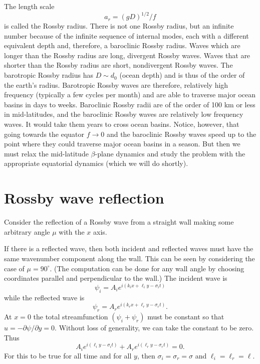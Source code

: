 \sourcepagebreak

The length scale
\[
	a_r=(gD)^{1/2}/f
\]
is called the Rossby radius. There is not one Rossby radius, but an infinite number
because of the infinite sequence of internal modes, each with a different equivalent
depth and, therefore, a baroclinic Rossby radius. Waves which are longer than the
Rossby radius are long, divergent Rossby waves. Waves that are shorter than the Rossby
radius are short, nondivergent Rossby waves. The barotropic Rossby radius has
$D\sim d_0$ (ocean depth) and is thus of the order of the earth's radius. Barotropic
Rossby waves are therefore, relatively high frequency (typically a few cycles per
month) and are able to traverse major ocean basins in days to weeks. Baroclinic Rossby
radii are of the order of 100 km or less in mid-latitudes, and the baroclinic Rossby
waves are relatively low frequency waves. It would take them years to cross ocean
basins. Notice, however, that going towards the equator $f\to0$ and the baroclinic
Rossby waves speed up to the point where they could traverse major ocean basins in a
season. But then we must relax the mid-latitude $\beta$-plane dynamics and study the
problem with the appropriate equatorial dynamics (which we will do shortly).

\section{Rossby wave reflection}

Consider the reflection of a Rossby wave from a straight wall making some arbitrary
angle $\mu$ with the $x$ axis.



If there is a reflected wave, then both incident and reflected waves must have the same
wavenumber component along the wall. This can be seen by considering the case of
$\mu=90^\circ$. (The computation can be done for any wall angle by choosing
coordinates parallel and perpendicular to the wall.) The incident wave is
\[
	\psi_i=A_i e^{i(k_i x+\ell_i y-\sigma_i t)}
\]
while the reflected wave is
\[
	\psi_r=A_r e^{i(k_r x+\ell_r y-\sigma_r t)}.
\]
At $x=0$ the total streamfunction $(\psi_i+\psi_r)$ must be constant so that
$u=-\partial\psi/\partial y=0$. Without loss of generality, we can take the constant
to be zero. Thus
\[
	A_i e^{i(\ell_i y-\sigma_i t)}
	+A_r e^{i(\ell_r y-\sigma_r t)}=0.
\]
For this to be true for all time and for all $y$, then
$\sigma_i=\sigma_r=\sigma$ and $\ell_i=\ell_r=\ell$.

